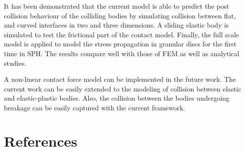 \documentclass[preprint,12pt]{elsarticle}
\begin{document}
It has been demonstrated that the current model is able to predict the post
collision behaviour of the colliding bodies by simulating collision between
flat, and curved interfaces in two and three dimensions. A sliding elastic
body is simulated to test the frictional part of the contact model. Finally,
the full scale model is applied to model the stress propagation in granular
discs for the first time in SPH. The results compare well with those of FEM as
well as analytical studies.

A non-linear contact force model can be implemented in the future work. The
current work can be easily extended to the modeling of collision between
elastic and elastic-plastic bodies. Also, the collision between the bodies
undergoing breakage can be easily captured with the current framework.

\section*{References}




\end{document}
